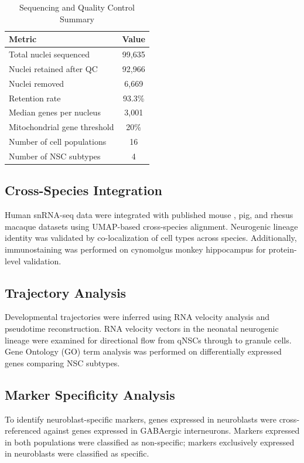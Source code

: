 \documentclass[11pt]{article}
\begin{document}
\begin{table}[ht]
\centering
\caption{Sequencing and Quality Control Summary}
\label{tab:qc}
\begin{tabular}{lc}
\toprule
\textbf{Metric} & \textbf{Value} \\
\midrule
Total nuclei sequenced & 99,635 \\
Nuclei retained after QC & 92,966 \\
Nuclei removed & 6,669 \\
Retention rate & 93.3\% \\
Median genes per nucleus & 3,001 \\
Mitochondrial gene threshold & 20\% \\
Number of cell populations & 16 \\
Number of NSC subtypes & 4 \\
\bottomrule
\end{tabular}
\end{table}

\subsection{Cross-Species Integration}

Human snRNA-seq data were integrated with published mouse \citep{hochgerner2018conserved}, pig, and rhesus macaque \citep{franjic2022transcriptomic} datasets using UMAP-based cross-species alignment. Neurogenic lineage identity was validated by co-localization of cell types across species. Additionally, immunostaining was performed on cynomolgus monkey hippocampus for protein-level validation.

\subsection{Trajectory Analysis}

Developmental trajectories were inferred using RNA velocity analysis \citep{lamanno2018rna} and pseudotime reconstruction. RNA velocity vectors in the neonatal neurogenic lineage were examined for directional flow from qNSCs through to granule cells. Gene Ontology (GO) term analysis was performed on differentially expressed genes comparing NSC subtypes.

\subsection{Marker Specificity Analysis}

To identify neuroblast-specific markers, genes expressed in neuroblasts were cross-referenced against genes expressed in GABAergic interneurons. Markers expressed in both populations were classified as non-specific; markers exclusively expressed in neuroblasts were classified as specific.
\end{document}
